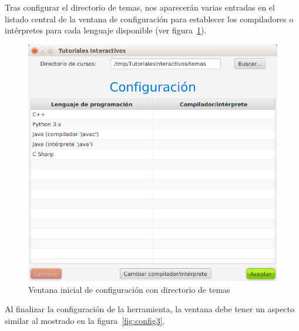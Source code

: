 \documentclass[]{article}
\begin{document}
Tras configurar el directorio de temas, nos aparecerán varias entradas en el listado central de la ventana de configuración para establecer los compiladores o intérpretes para cada lenguaje disponible (ver figura~\ref{fig:config2}).
%
\begin{figure}[tbp]
\begin{center}
\includegraphics[scale=0.4]{Configuracion_lenguajes_vacio.png}
\end{center}
\caption{Ventana inicial de configuración con directorio de temas\label{fig:config2}}
\end{figure}
%


Al finalizar la configuración de la herramienta, la ventana debe tener un aspecto similar al mostrado en la figura~\ref{fig:config3}.
\end{document}
